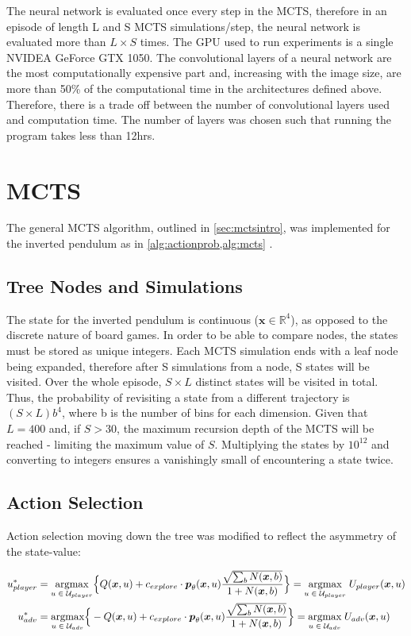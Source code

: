 \documentclass[../main.tex]{subfiles}
\begin{document}
The neural network is evaluated once every step in the MCTS, therefore in an episode of length L and S MCTS simulations/step, the neural network is evaluated more than $L\times S$ times. The GPU used to run experiments is a single NVIDEA GeForce GTX 1050. The convolutional layers of a neural network are the most computationally expensive part and, increasing with the image size, are more than 50\% of the computational time in the architectures defined above. Therefore, there is a trade off between the number of convolutional layers used and computation time. The number of layers was chosen such that running the program takes less than 12hrs.

\section{MCTS}

The general MCTS algorithm, outlined in \cref{sec:mctsintro}, was implemented for the inverted pendulum as in \cref{alg:actionprob,alg:mcts} .

\subsection{Tree Nodes and Simulations}

The state for the inverted pendulum is continuous ($\boldsymbol{x} \in \mathbb{R}^4$), as opposed to the discrete nature of board games. In order to be able to compare nodes, the states must be stored as unique integers. Each MCTS simulation ends with a leaf node being expanded, therefore after S simulations from a node, S states will be visited. Over the whole episode, $S\times L$ distinct states will be visited in total. Thus, the probability of revisiting a state from a different trajectory is $(S \times L)b^4$, where b is the number of bins for each dimension. Given that $L=400$ and, if $S>30$, the maximum recursion depth of the MCTS will be reached - limiting the maximum value of $S$. Multiplying the states by $10^{12}$ and converting to integers ensures a vanishingly small of encountering a state twice.

\subsection{Action Selection}
Action selection moving down the tree was modified to reflect the asymmetry of the state-value:

{
\newcommand{\bx}{\boldsymbol{x}}
\begin{align}
   u^*_{player} & = \underset{u \; \in \; \mathcal{U}_{player}}{\text{argmax}} \Big{\{} Q(\bx, u) + c_{explore} \cdot\boldsymbol{p}_\theta (\bx, u)\frac{\sqrt{\sum_b N(\bx, b)}}{1 + N(\bx, b)}\Big{\}} =  \underset{u \; \in \; \mathcal{U}_{player}}{\text{argmax}} \; U_{player}(\bx, u) \\
   u^*_{adv} & = \underset{u \; \in \; \mathcal{U}_{adv}}{\text{argmax}} \Big{\{} -Q(\bx, u) + c_{explore} \cdot\boldsymbol{p}_\theta (\bx, u)\frac{\sqrt{\sum_b N(\bx, b)}}{1 + N(\bx, b)}\Big{\}} = \underset{u \; \in \; \mathcal{U}_{adv}}{\text{argmax}} \; U_{adv}(\bx, u)
   \label{eqn:IPucb}
\end{align}
}
\end{document}
